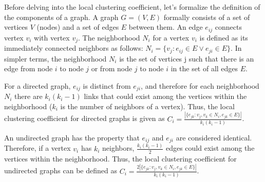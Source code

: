 Before delving into the local clustering coefficient, let's formalize the definition of the components of a graph. A graph $G=(V,E)$ formally consists of a set of vertices $V$ (nodes) and a set of edges $E$ between them. An edge $e_{ij}$ connects vertex $v_{i}$  with vertex $v_{j}$. The neighborhood $N_{i}$ for a vertex $v_{i}$ is defined as its immediately connected neighbors as follows: $N_i = \{v_j : e_{ij} \in E \lor e_{ji} \in E\}$. In simpler terms, the neighborhood $N_i$ is the set of vertices j such that there is an edge from node $i$ to node $j$ or from node $j$ to node $i$ in the set of all edges $E$.

For a directed graph, $e_{ij}$ is distinct from $e_{ji}$, and therefore for each neighborhood $N_{i}$ there are $k_{i}(k_{i}-1)$ links that could exist among the vertices within the neighborhood ($k_{i}$ is the number of neighbors of a vertex). Thus, the local clustering coefficient for directed graphs is given as $C_{i}={\frac {|\{e_{jk}:v_{j},v_{k}\in N_{i},e_{{jk}}\in E\}|}{k_{i}(k_{i}-1)}}$. 

An undirected graph has the property that $e_{ij}$ and $e_{ji}$ are considered identical. Therefore, if a vertex $v_{i}$ has $k_{i}$ neighbors, $\frac {k_{i}(k_{i}-1)}{2}$   edges could exist among the vertices within the neighborhood. Thus, the local clustering coefficient for undirected graphs can be defined as $C_{i}=\frac {2|\{e_{{jk}}:v_{j},v_{k}\in N_{i},e_{{jk}}\in E\}|}{k_{i}(k_{i}-1)}$.   





